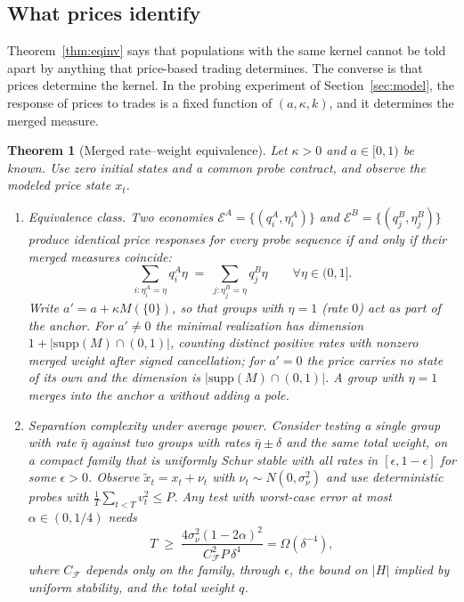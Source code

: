 \documentclass[12pt]{article}
\newtheorem{theorem}{Theorem}[section]
\theoremstyle{definition}
\theoremstyle{remark}
\begin{document}
\subsection{What prices identify}

Theorem~\ref{thm:eqinv} says that populations with the same kernel cannot be told apart by anything that price-based trading determines. The converse is that prices determine the kernel. In the probing experiment of Section~\ref{sec:model}, the response of prices to trades is a fixed function of $(a,\kappa,k)$, and it determines the merged measure.


\begin{theorem}[Merged rate--weight equivalence]\label{thm:merged}
Let $\kappa>0$ and $a\in[0,1)$ be known. Use zero initial states and a common probe contract, and observe the modeled price state $x_t$.
\begin{enumerate}[label=(\roman*)]
\item \emph{Equivalence class.} Two economies $\mathcal E^A=\{(q_i^A,\eta_i^A)\}$ and $\mathcal E^B=\{(q_j^B,\eta_j^B)\}$ produce identical price responses for every probe sequence if and only if their merged measures coincide:
\begin{equation}\label{eq:merged}
\sum_{i:\eta_i^A=\eta} q_i^A\eta \;=\; \sum_{j:\eta_j^B=\eta} q_j^B\eta\qquad\forall\eta\in(0,1].
\end{equation}
Write $a'=a+\kappa M(\{0\})$, so that groups with $\eta=1$ (rate $0$) act as part of the anchor. For $a'\neq0$ the minimal realization has dimension $1+|\mathrm{supp}(M)\cap(0,1)|$, counting distinct positive rates with nonzero merged weight after signed cancellation; for $a'=0$ the price carries no state of its own and the dimension is $|\mathrm{supp}(M)\cap(0,1)|$. A group with $\eta=1$ merges into the anchor $a$ without adding a pole.
\item \emph{Separation complexity under average power.} Consider testing a single group with rate $\bar\eta$ against two groups with rates $\bar\eta\pm\delta$ and the same total weight, on a compact family that is uniformly Schur stable with all rates in $[\epsilon,1-\epsilon]$ for some $\epsilon>0$. Observe $\tilde x_t=x_t+\nu_t$ with $\nu_t\sim N(0,\sigma_\nu^2)$ and use deterministic probes with $\frac1T\sum_{t<T}v_t^2\le P$. Any test with worst-case error at most $\alpha\in(0,1/4)$ needs
\begin{equation}\label{eq:Tpower}
T\;\ge\;\frac{4\sigma_\nu^2(1-2\alpha)^2}{C_{\mathcal F}^2P\,\delta^4}=\Omega(\delta^{-4}),
\end{equation}
where $C_{\mathcal F}$ depends only on the family, through $\epsilon$, the bound on $|H|$ implied by uniform stability, and the total weight $q$.
\end{enumerate}
\end{theorem}
\end{document}
